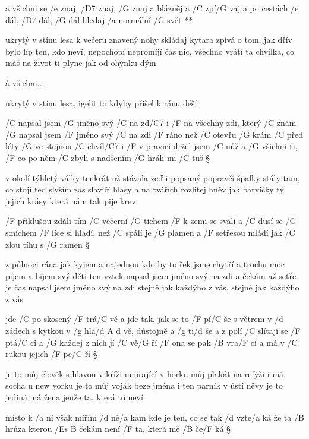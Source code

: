 \R a všichni se /e znaj, /D7 znaj, /G znaj
   a blázněj a /C zpí/G vaj
   a po cestách /e dál, /D7 dál, /G dál
   hledaj /a normální /G svět **

ukrytý v stínu lesa k večeru
znavený nohy skládaj
kytara zpívá o tom, jak dřív bylo líp
ten, kdo neví, nepochopí
nepromíjí čas nic, všechno vrátí
ta chvilka, co máš na život ti plyne jak od ohýnku dým \s

\r a všichni...

ukrytý v stínu lesa, igelit
to kdyby přišel k ránu déšť




/C napsal jsem /G jméno svý /C na zd/C7 i
/F na všechny zdi, který /C znám
/G napsal jsem /F jméno svý /C na zdi
/F ráno než /C otevřu /G krám
/C před léty /G ve stejnou /C chvíl/C7 i
/F v pravici držel jsem /C nůž
a /G všichni ti, /F co po něm /C zbyli
s nadšením /G hráli mi /C tuš \S

v okolí týhletý války
tenkrát už stávala zeď
i popsaný popravčí špalky
stály tam, co stojí teď
slyším zas slavičí hlasy
a na tvářích rozlitej hněv
jak barvičky tý jejich krásy
která nám tak pije krev \s

/F přiklušou zdáli tím /C večerní /G tichem
/F k zemi se svalí a /C dusí se /G smíchem
/F líce si hladí, než /C spálí je /G plamen
a /F setřesou mládí jak /C zlou tíhu s /G ramen \S

z půlnoci rána jak kyjem
a najednou kdo by to řek
jsme chytří a trochu moc pijem
a bijem svý děti ten vztek
napsal jsem jméno svý na zdi
a čekám až setře je čas
napsal jsem jméno svý na zdi
stejně jak každýho z vás, stejně jak každýho z vás




jde /C po skosený /F trá/C vě a jde tak, jak se to /F pí/C še
s větrem v /d zádech s kytkou v /g hla/{d A d} vě, důstojně a /g ti/d še
a z polí /C slítají se /F ptá/C ci a /G každej z nich jí /C vě/G ří
/F ona se pak /B vra/F cí a má v /C rukou jejich /F pe/C ří \S

je to můj člověk s hlavou v kříži umírající v horku
můj plakát na refýži i má socha u new yorku
je to můj voják beze jména i ten parník v ústí něvy
je to jediná má žena jenže ta, která to neví \s

místo k /a  ní však mířím /d ně/a kam
kde je ten, co se tak /d vzte/a ká
že ta /B hrůza kterou /{Es B} čekám není /F ta, která mě /B če/F ká \S

